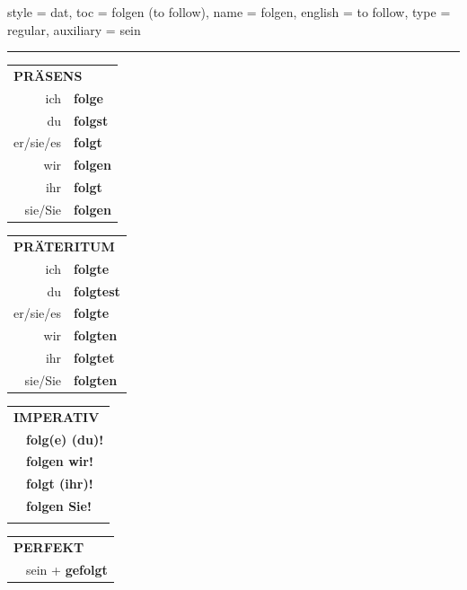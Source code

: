 \begin{verbentry}{
  style = {dat},
  toc = {folgen (to follow)},
  name = {folgen},
  english = {to follow},
  type = {regular},
  auxiliary = {sein}
}
 
    
     \vspace{5pt}

    \hrule
    
    \vspace{5pt}

  \begin{tabular}{rl}
     \multicolumn{2}{l}{\textbf{PRÄSENS} }\\
    ich & \textbf{folge}\\
    du & \textbf{folgst}\\
    er/sie/es & \textbf{folgt}\\
    wir & \textbf{folgen}\\
    ihr & \textbf{folgt}\\
    sie/Sie & \textbf{folgen}\\
  \end{tabular}
  \hfill
     \begin{tabular}{rl}
    \multicolumn{2}{l}{\textbf{PRÄTERITUM} }\\
    ich & \textbf{folgte}\\
    du & \textbf{folgtest}\\
    er/sie/es & \textbf{folgte}\\
    wir & \textbf{folgten}\\
    ihr & \textbf{folgtet}\\
    sie/Sie & \textbf{folgten}\\
  \end{tabular}
  \hfill
  \begin{tabular}{rl}
     \multicolumn{2}{l}{\textbf{IMPERATIV} }\\
   & \textbf{folg(e) (du)!}\\
   & \textbf{folgen wir!}\\
   & \textbf{folgt (ihr)!}\\
   & \textbf{folgen Sie!}\\
   & \vspace{10pt}
  \end{tabular}

    \vspace{10pt}

 \begin{tabular}{rl}
     \multicolumn{2}{l}{\textbf{PERFEKT}}\\
   & sein + \textbf{gefolgt}\\
  \end{tabular}
\hfill
   \begin{tabular}{rl}
   

\end{tabular}
\end{verbentry}
